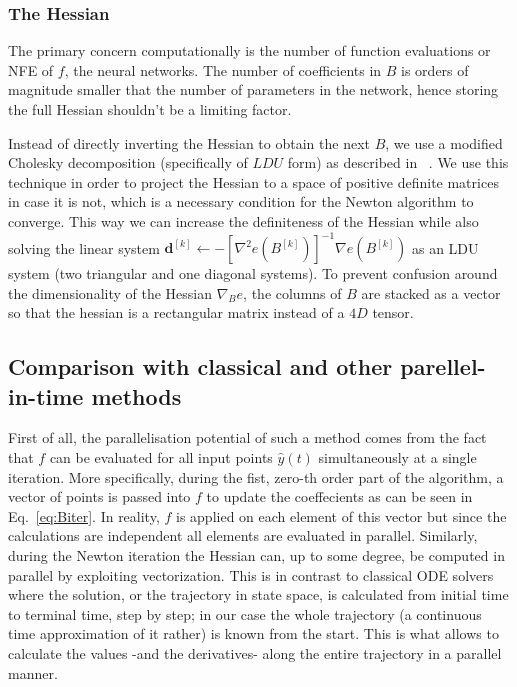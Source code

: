 \documentclass[11pt]{report}
\begin{document}
    \subsubsection{The Hessian}

    The primary concern computationally is the number of function evaluations or NFE of $f$,
    the neural networks.
    The number of coefficients in $B$ is orders of magnitude smaller that the number of parameters in the network,
    hence storing the full Hessian shouldn't be a limiting factor.

    Instead of directly inverting the Hessian to obtain the next $B$, we use a modified Cholesky decomposition
    (specifically of $LDU$ form) as described in ~\cite{gill2019practical}.
    We use this technique in order to project the Hessian to a space of positive definite matrices in case it is not,
    which is a necessary condition for the Newton algorithm to converge.
    This way we can increase the definiteness of the Hessian while also solving the linear system
    $\pmb{d}^{[k]} \gets -\left[ \nabla^2 e(B^{[k]}) \right]^{-1} \nabla e(B^{[k]})$ as an LDU system (two triangular
    and one diagonal systems).
    To prevent confusion around the dimensionality of the Hessian $\nabla_{B} e$,
    the columns of $B$ are stacked as a vector so that the hessian is a rectangular matrix instead of a $4D$ tensor.

    \subsection{Comparison with classical and other parellel-in-time methods}
    First of all, the parallelisation potential of such a method comes from the fact that $f$ can be evaluated for all
    input points $\hat y(t)$ simultaneously at a single iteration.
    More specifically, during the fist, zero-th order part of the algorithm, a vector of points is passed into $f$ to
    update the coeffecients as can be seen in Eq.~\eqref{eq:Biter}.
    In reality, $f$ is applied on each element of this vector but since the calculations are independent all elements are
    evaluated in parallel.
    Similarly, during the Newton iteration the Hessian can, up to some degree, be computed in parallel by exploiting
    vectorization.
    This is in contrast to classical ODE solvers where the solution, or the trajectory in state space, is calculated from
    initial time to terminal time, step by step; in our case the whole trajectory (a continuous time approximation
    of it rather) is known from the start.
    This is what allows to calculate the values -and the derivatives- along the entire trajectory in a parallel manner.
\end{document}
